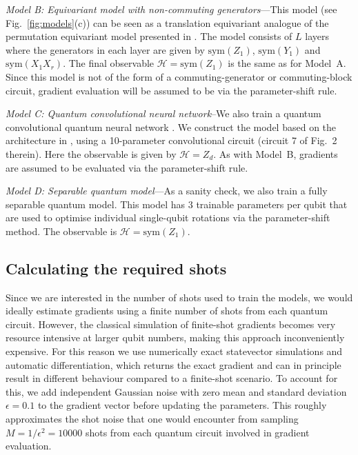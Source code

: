 \documentclass[a4paper,twocolumn,11pt,accepted=2025-09-06]{quantumarticle}
\begin{document}
\emph{Model B: Equivariant model with non-commuting generators}---This model (see Fig.\ \ref{fig:models}(c)) can be seen as a translation equivariant analogue of the permutation equivariant model presented in \cite{schatzki2022theoretical}. The model consists of $L$ layers where the generators in each layer are given by $\text{sym}(Z_1)$, $\text{sym}(Y_1)$ and $\text{sym}(X_1X_{r})$. The final observable $\mathcal{H}=\text{sym}(Z_1)$ is the same as for Model~A. Since this model is not of the form of a commuting-generator or commuting-block circuit, gradient evaluation will be assumed to be via the parameter-shift rule.  

\emph{Model C: Quantum convolutional neural network}--We also train a quantum convolutional quantum neural network \cite{qconv,hur2022quantum}. We construct the model based on the architecture in \cite{hur2022quantum}, using a 10-parameter convolutional circuit (circuit 7 of Fig.\ 2 therein). Here the observable is given by $\mathcal{H}=Z_d$. As with Model~B, gradients are assumed to be evaluated via the parameter-shift rule. 

\emph{Model D: Separable quantum model}---As a sanity check, we also train a fully separable quantum model. This model has $3$ trainable parameters per qubit that are used to optimise individual single-qubit rotations via the parameter-shift method. The observable is $\mathcal{H}=\text{sym}(Z_1)$.


\subsection{Calculating the required shots}\label{sec:modelshots}
Since we are interested in the number of shots used to train the models, we would ideally estimate gradients using a finite number of shots from each quantum circuit. 
However, the classical simulation of finite-shot gradients becomes very resource intensive at larger qubit numbers, making this approach inconveniently expensive.
For this reason we use numerically exact statevector simulations and automatic differentiation, which returns the exact gradient and can in principle result in different behaviour compared to a finite-shot scenario. To account for this, we add independent Gaussian noise with zero mean and standard deviation $\epsilon= 0.1$ to the gradient vector before updating the parameters. This roughly approximates the shot noise that one would encounter from sampling $M=1/\epsilon^2=10000$ shots from each quantum circuit involved in gradient evaluation. 
\end{document}
